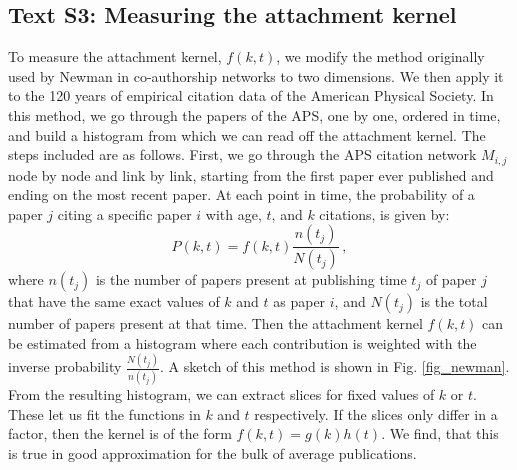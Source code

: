 \documentclass[fleqn,10pt]{wlscirep}
\begin{document}
\subsection*{Text S3: Measuring the attachment kernel}
\label{SI3}

To measure the attachment kernel, $f(k,t)$, we modify the method originally used by Newman in co-authorship networks \cite{Newman2001} to two dimensions. We then apply it to the 120 years of empirical citation data of the American Physical Society.
In this method, we go through the papers of the APS, one by one, ordered in time, and build a histogram from which we can read off the attachment kernel. The steps included are as follows. First, we go through the APS citation network $M_{i,j}$ node by node and link by link,  starting from the first paper ever published and ending on the most recent paper. At each point in time, the probability of a paper $j$ citing a specific paper $i$ with age,  $t$, and $k$ citations, is given by:
%
\begin{equation}
    P(k,t) = f(k, t) \frac{n(t_j)}{N(t_j)} \, , 
\end{equation}
%
where $n(t_j)$ is the number of papers present at publishing time $t_j$ of paper $j$ that have the same exact values of $k$ and $t$ as paper $i$,  and $N(t_j)$ is the total number of papers present at that time. Then the attachment kernel $f(k,t)$ can be estimated from a histogram where each contribution is weighted with the inverse probability $\frac{N(t_j)}{n(t_j)}$. A sketch of this method is shown in Fig. \ref{fig_newman}.
From the resulting histogram, we can extract slices for fixed values of $k$ or $t$. These let us fit the functions in $k$ and $t$ respectively. If the slices only differ in a factor, then the kernel is of the form $f(k,t)=g(k)h(t)$. We find, that this is true in good approximation for the bulk of average publications. 
\end{document}
